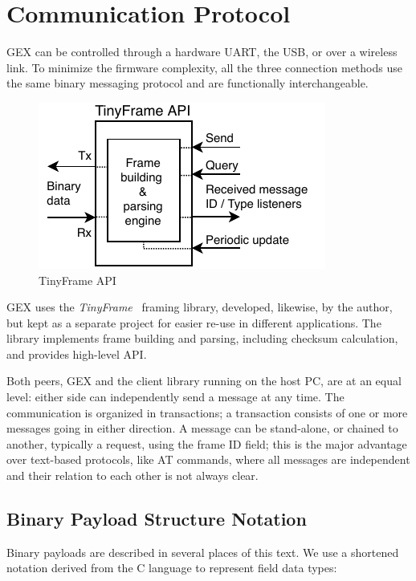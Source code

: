\chapter{Communication Protocol} \label{sec:tinyframe}

GEX can be controlled through a hardware \gls{UART}, the \gls{USB}, or over a wireless link. To minimize the firmware complexity, all the three connection methods use the same binary messaging protocol and are functionally interchangeable.

\begin{figure}
	\vspace{-1em}
	\centering
	\includegraphics[scale=1]{img/tf-conceptual.pdf}
	\caption{\label{fig:tf_conceptual}TinyFrame API}
\end{figure}

GEX uses the \textit{TinyFrame}~\cite{tinyframerepo} framing library, developed, likewise, by the author, but kept as a separate project for easier re-use in different applications. The library implements frame building and parsing, including checksum calculation, and provides high-level \gls{API}.

Both peers, GEX and the client library running on the host \gls{PC}, are at an equal level: either side can independently send a message at any time. The communication is organized in transactions; a transaction consists of one or more messages going in either direction. A message can be stand-alone, or chained to another, typically a request, using the frame ID field; this is the major advantage over text-based protocols, like AT commands, where all messages are independent and their relation to each other is not always clear.

\section{Binary Payload Structure Notation}

Binary payloads are described in several places of this text. We use a shortened notation derived from the C language to represent field data types:

